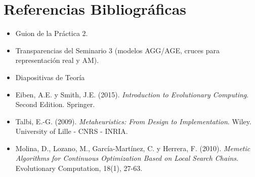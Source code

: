 \documentclass[12pt, a4paper]{article}
\begin{document}
\hypersetup{pageanchor=false}

\hypersetup{pageanchor=true}
\newpage

\tableofcontents
\newpage








\newpage
{}

\section*{Referencias Bibliográficas}
\begin{itemize}
    \item Guion de la Práctica 2.
    \item Transparencias del Seminario 3 (modelos AGG/AGE, cruces para representación real y AM).
    \item Diapositivas de Teoría
    \item Eiben, A.E. y Smith, J.E. (2015). \textit{Introduction to Evolutionary Computing}. Second Edition. Springer.
    \item Talbi, E.-G. (2009). \textit{Metaheuristics: From Design to Implementation}. Wiley. University of Lille - CNRS - INRIA.
    \item Molina, D., Lozano, M., García-Martínez, C. y Herrera, F. (2010). \textit{Memetic Algorithms for Continuous Optimization Based on Local Search Chains}. Evolutionary Computation, 18(1), 27-63.
\end{itemize}
\end{document}

